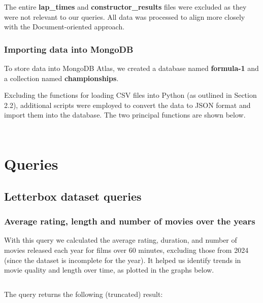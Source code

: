 \documentclass{Configuration_Files/PoliMi3i_thesis}
\begin{document}
The entire \textbf{lap\_times} and \textbf{constructor\_results} files were excluded as they were not relevant to our queries. All data was processed to align more closely with the Document-oriented approach.

\subsection*{Importing data into MongoDB}
To store data into MongoDB Atlas, we created a database named \textbf{formula-1} and a collection named \textbf{championships}.

Excluding the functions for loading CSV files into Python (as outlined in Section 2.2), additional scripts were employed to convert the data to JSON format and import them into the database. The two principal functions are shown below.

\vspace{0.5cm}
\inputminted{python}{formula1/dataset/export.py}

\vspace{0.5cm}
\inputminted{python}{formula1/dataset/import.py}



\chapter{Queries}

\section{Letterbox dataset queries}

\subsection{Average rating, length and number of movies over the years}

With this query we calculated the average rating, duration, and number of movies released each year for films over 60 minutes, excluding those from 2024 (since the dataset is incomplete for the year). It helped us identify trends in movie quality and length over time, as plotted in the graphs below.

\inputminted[frame=single,framesep=10pt,breaklines]{cypher}{letterboxd/queries/query1.cypher}

The query returns the following (truncated) result:
\end{document}
